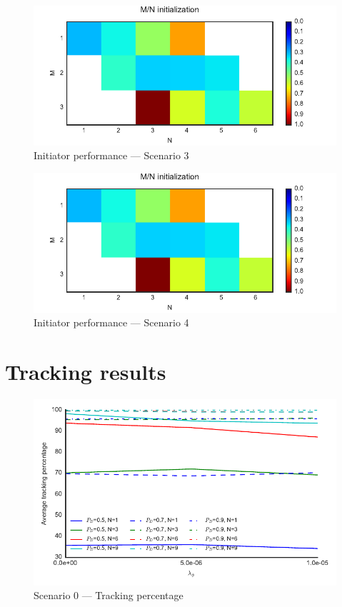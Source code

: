 \begin{figure}
 \centering
 \includegraphics{Figures/plots/Scenario3_Init-Performance.pdf}
 \caption{Initiator performance --- Scenario 3}\label{fig:init_performance_scenario3}
\end{figure}
\begin{figure}
 \centering
 \includegraphics{Figures/plots/Scenario4_Init-Performance.pdf}
 \caption{Initiator performance --- Scenario 4}\label{fig:init_performance_scenario4}
\end{figure}

\section{Tracking results}

\begin{figure}[H]
\centering
\includegraphics{Figures/plots/Scenario0_Tracking-TrackingPercentage.pdf}
\caption{Scenario 0 --- Tracking percentage}\label{fig:scenario0_tracking_percentage}
\end{figure}


